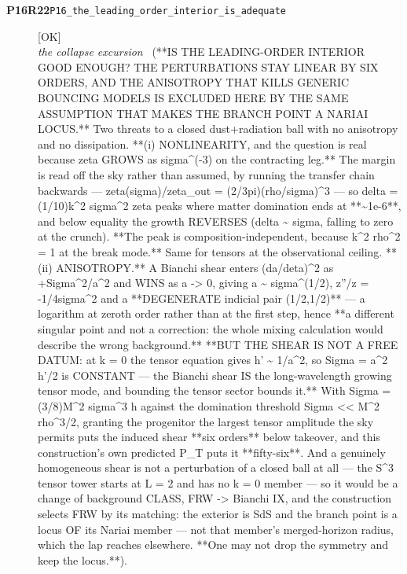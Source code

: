 \begin{description}
\item[\textbf{P16R22}\quad\texttt{P16\_the\_leading\_order\_interior\_is\_adequate}]\hfill\textsf{[OK]}\\
\textit{the collapse excursion} \ (**IS THE LEADING-ORDER INTERIOR GOOD ENOUGH? THE PERTURBATIONS STAY LINEAR BY SIX ORDERS, AND THE ANISOTROPY THAT KILLS GENERIC BOUNCING MODELS IS EXCLUDED HERE BY THE SAME ASSUMPTION THAT MAKES THE BRANCH POINT A NARIAI LOCUS.** Two threats to a closed dust+radiation ball with no anisotropy and no dissipation. **(i) NONLINEARITY, and the question is real because zeta GROWS as \textbar{}sigma\textbar{}\textasciicircum{}(-3) on the contracting leg.** The margin is read off the sky rather than assumed, by running the transfer chain backwards --- zeta(sigma)/zeta\_out = (2/3pi)(rho/\textbar{}sigma\textbar{})\textasciicircum{}3 --- so delta = (1/10)k\textasciicircum{}2 sigma\textasciicircum{}2 zeta peaks where matter domination ends at **\textasciitilde{}1e-6**, and below equality the growth REVERSES (delta \textasciitilde{} \textbar{}sigma\textbar{}, falling to zero at the crunch). **The peak is composition-independent, because k\textasciicircum{}2 rho\textasciicircum{}2 = 1 at the break mode.** Same for tensors at the observational ceiling. **(ii) ANISOTROPY.** A Bianchi shear enters (da/deta)\textasciicircum{}2 as +Sigma\textasciicircum{}2/a\textasciicircum{}2 and WINS as a -> 0, giving a \textasciitilde{} \textbar{}sigma\textbar{}\textasciicircum{}(1/2), z''/z = -1/4sigma\textasciicircum{}2 and a **DEGENERATE indicial pair (1/2,1/2)** --- a logarithm at zeroth order rather than at the first step, hence **a different singular point and not a correction: the whole mixing calculation would describe the wrong background.** **BUT THE SHEAR IS NOT A FREE DATUM: at k = 0 the tensor equation gives h' \textasciitilde{} 1/a\textasciicircum{}2, so Sigma = a\textasciicircum{}2 h'/2 is CONSTANT --- the Bianchi shear IS the long-wavelength growing tensor mode, and bounding the tensor sector bounds it.** With Sigma = (3/8)M\textasciicircum{}2 \textbar{}sigma\textbar{}\textasciicircum{}3 h against the domination threshold Sigma << M\textasciicircum{}2 rho\textasciicircum{}3/2, granting the progenitor the largest tensor amplitude the sky permits puts the induced shear **six orders** below takeover, and this construction's own predicted P\_T puts it **fifty-six**. And a genuinely homogeneous shear is not a perturbation of a closed ball at all --- the S\textasciicircum{}3 tensor tower starts at L = 2 and has no k = 0 member --- so it would be a change of background CLASS, FRW -> Bianchi IX, and the construction selects FRW by its matching: the exterior is SdS and the branch point is a locus OF its Nariai member --- not that member's merged-horizon radius, which the lap reaches elsewhere. **One may not drop the symmetry and keep the locus.**). 

\end{description}
